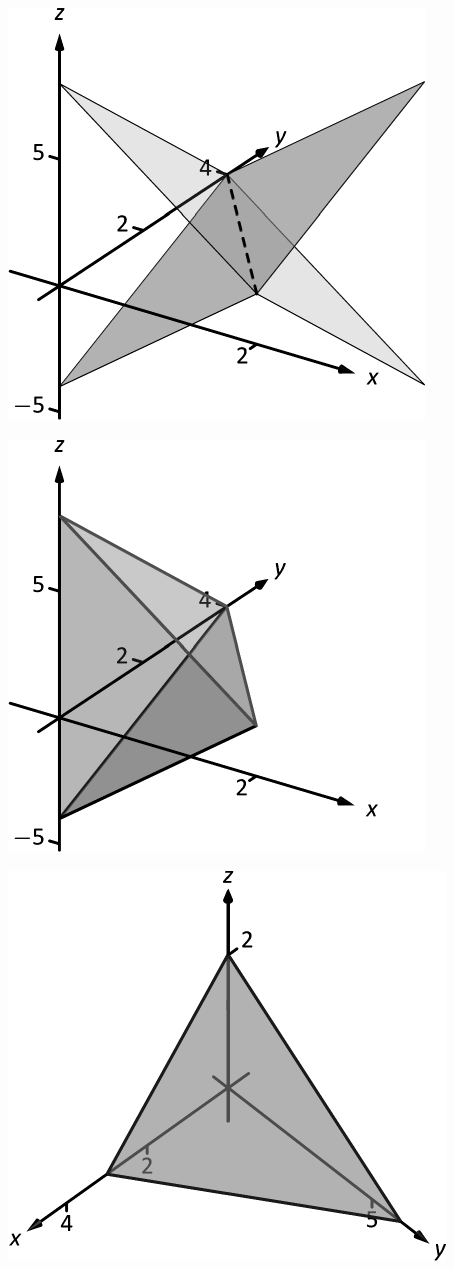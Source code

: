 \documentclass[10pt]{article}
\begin{document}
\includegraphics{figtrip1_3DBW.pdf}
\texttt{}

\includegraphics{figtrip1b_3DBW.pdf}
\texttt{}

\includegraphics{figtrip2_3DBW.pdf}
\texttt{}
\end{document}

